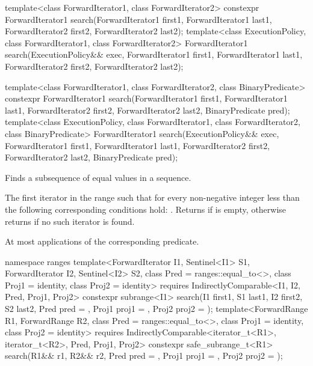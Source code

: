 %
\begin{itemdecl}
template<class ForwardIterator1, class ForwardIterator2>
  constexpr ForwardIterator1
    search(ForwardIterator1 first1, ForwardIterator1 last1,
           ForwardIterator2 first2, ForwardIterator2 last2);
template<class ExecutionPolicy, class ForwardIterator1, class ForwardIterator2>
  ForwardIterator1
    search(ExecutionPolicy&& exec,
           ForwardIterator1 first1, ForwardIterator1 last1,
           ForwardIterator2 first2, ForwardIterator2 last2);

template<class ForwardIterator1, class ForwardIterator2,
         class BinaryPredicate>
  constexpr ForwardIterator1
    search(ForwardIterator1 first1, ForwardIterator1 last1,
           ForwardIterator2 first2, ForwardIterator2 last2,
           BinaryPredicate pred);
template<class ExecutionPolicy, class ForwardIterator1, class ForwardIterator2,
         class BinaryPredicate>
  ForwardIterator1
    search(ExecutionPolicy&& exec,
           ForwardIterator1 first1, ForwardIterator1 last1,
           ForwardIterator2 first2, ForwardIterator2 last2,
           BinaryPredicate pred);
\end{itemdecl}

\begin{itemdescr}
\pnum
\effects
Finds a subsequence of equal values in a sequence.

\pnum
\returns
The first iterator
in the range 
such that for every non-negative integer
less than
the following corresponding conditions hold:
.
Returns 
if  is empty,
otherwise returns 
if no such iterator is found.

\pnum
\complexity
At most
applications of the corresponding predicate.
\end{itemdescr}

%
\begin{itemdecl}
namespace ranges {
  template<ForwardIterator I1, Sentinel<I1> S1, ForwardIterator I2,
      Sentinel<I2> S2, class Pred = ranges::equal_to<>,
      class Proj1 = identity, class Proj2 = identity>
    requires IndirectlyComparable<I1, I2, Pred, Proj1, Proj2>
    constexpr subrange<I1>
      search(I1 first1, S1 last1, I2 first2, S2 last2, Pred pred = {},
             Proj1 proj1 = {}, Proj2 proj2 = {});
  template<ForwardRange R1, ForwardRange R2, class Pred = ranges::equal_to<>,
      class Proj1 = identity, class Proj2 = identity>
    requires IndirectlyComparable<iterator_t<R1>, iterator_t<R2>, Pred, Proj1, Proj2>
    constexpr safe_subrange_t<R1>
      search(R1&& r1, R2&& r2, Pred pred = {},
             Proj1 proj1 = {}, Proj2 proj2 = {});
}
\end{itemdecl}

